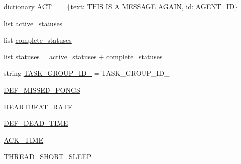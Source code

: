 \begin{DoxyCompactItemize}
\item 
dictionary \hyperlink{namespaceparlai_1_1mturk_1_1core_1_1test_1_1test__full__system_aa4033dfc819b4c6dddee5e3d8897ac25}{A\+C\+T\+\_} = \{\textquotesingle{}text\textquotesingle{}\+: \textquotesingle{}T\+H\+IS IS A M\+E\+S\+S\+A\+GE A\+G\+A\+IN\textquotesingle{}, \textquotesingle{}id\textquotesingle{}\+: \hyperlink{namespaceparlai_1_1mturk_1_1core_1_1test_1_1test__full__system_a6f2c4ad9653ea52bfba270435d2731f7}{A\+G\+E\+N\+T\+\_\+\+ID}\}
\item 
list \hyperlink{namespaceparlai_1_1mturk_1_1core_1_1test_1_1test__full__system_af8d57ba2ced552d014886de98c20273b}{active\+\_\+statuses}
\item 
list \hyperlink{namespaceparlai_1_1mturk_1_1core_1_1test_1_1test__full__system_a85057c5db2757458efa55ef9832e3fdc}{complete\+\_\+statuses}
\item 
list \hyperlink{namespaceparlai_1_1mturk_1_1core_1_1test_1_1test__full__system_afb083fbb6576cc521606da98e0e95333}{statuses} = \hyperlink{namespaceparlai_1_1mturk_1_1core_1_1test_1_1test__full__system_af8d57ba2ced552d014886de98c20273b}{active\+\_\+statuses} + \hyperlink{namespaceparlai_1_1mturk_1_1core_1_1test_1_1test__full__system_a85057c5db2757458efa55ef9832e3fdc}{complete\+\_\+statuses}
\item 
string \hyperlink{namespaceparlai_1_1mturk_1_1core_1_1test_1_1test__full__system_ab00776d073302680063fff8d63d789b1}{T\+A\+S\+K\+\_\+\+G\+R\+O\+U\+P\+\_\+\+I\+D\+\_} = \textquotesingle{}T\+A\+S\+K\+\_\+\+G\+R\+O\+U\+P\+\_\+\+I\+D\+\_\textquotesingle{}
\item 
\hyperlink{namespaceparlai_1_1mturk_1_1core_1_1test_1_1test__full__system_ad31aad24f1589a73a56a9c07eda15c1d}{D\+E\+F\+\_\+\+M\+I\+S\+S\+E\+D\+\_\+\+P\+O\+N\+GS}
\item 
\hyperlink{namespaceparlai_1_1mturk_1_1core_1_1test_1_1test__full__system_a5d66246f51505b73b94856fb455d16a0}{H\+E\+A\+R\+T\+B\+E\+A\+T\+\_\+\+R\+A\+TE}
\item 
\hyperlink{namespaceparlai_1_1mturk_1_1core_1_1test_1_1test__full__system_a31494b79df29f368c4772ba4f8d7fbaf}{D\+E\+F\+\_\+\+D\+E\+A\+D\+\_\+\+T\+I\+ME}
\item 
\hyperlink{namespaceparlai_1_1mturk_1_1core_1_1test_1_1test__full__system_a27d685a0b640f60b477faa936c4857bd}{A\+C\+K\+\_\+\+T\+I\+ME}
\item 
\hyperlink{namespaceparlai_1_1mturk_1_1core_1_1test_1_1test__full__system_ab15af52c286bf0000c1b915a660746fc}{T\+H\+R\+E\+A\+D\+\_\+\+S\+H\+O\+R\+T\+\_\+\+S\+L\+E\+EP}

\end{DoxyCompactItemize}
